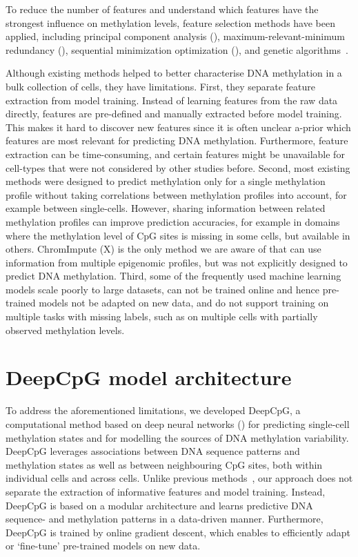 To reduce the number of features and understand which features have the strongest influence on methylation levels, feature selection methods have been applied, including principal component analysis (\citep{zheng_enhancement_2011,zheng_cpgimethpred:_2013}), maximum-relevant-minimum redundancy (\citep{lu_predicting_2010}), sequential minimization optimization (\citep{malousi_predictive_2014}), and genetic algorithms~\citep{li_prediction_2014}.

Although existing methods helped to better characterise DNA methylation in a bulk collection of cells, they have limitations. First, they separate feature extraction from model training. Instead of learning features from the raw data directly, features are pre-defined and manually extracted before model training. This makes it hard to discover new features since it is often unclear a-prior which features are most relevant for predicting DNA methylation. Furthermore, feature extraction can be time-consuming, and certain features might be unavailable for cell-types that were not considered by other studies before. Second, most existing methods were designed to predict methylation only for a single methylation profile without taking correlations between methylation profiles into account, for example between single-cells. However, sharing information between related methylation profiles can improve prediction accuracies, for example in domains where the methylation level of CpG sites is missing in some cells, but available in others. ChromImpute (X) is the only method we are aware of that can use information from multiple epigenomic profiles, but was not explicitly designed to predict DNA methylation. Third, some of the frequently used machine learning models scale poorly to large datasets, can not be trained online and hence pre-trained models not be adapted on new data, and do not support training on multiple tasks with missing labels, such as on multiple cells with partially observed methylation levels.


\section{DeepCpG model architecture} \label{sec:dcpg_model}

To address the aforementioned limitations, we developed DeepCpG, a computational method based on deep neural networks () for predicting single-cell methylation states and for modelling the sources of DNA methylation variability. DeepCpG leverages associations between DNA sequence patterns and methylation states as well as between neighbouring CpG sites, both within individual cells and across cells. Unlike previous methods~\citep{bhasin_prediction_2005,li_prediction_2014,liu_idna-methyl:_2015,lu_predicting_2010,stevens_estimating_2013,zhang_predicting_2015,zhou_prediction_2012}, our approach does not separate the extraction of informative features and model training. Instead, DeepCpG is based on a modular architecture and learns predictive DNA sequence- and methylation patterns in a data-driven manner. Furthermore, DeepCpG is trained by online gradient descent, which enables to efficiently adapt or `fine-tune' pre-trained models on new data.

